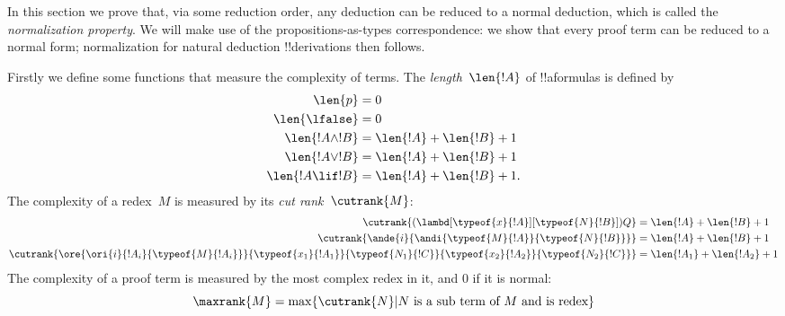 \documentclass[../../../include/open-logic-section]{subfiles}
\begin{document}


In this section we prove that, via some reduction order, any deduction
can be reduced to a normal deduction, which is called the
\emph{normalization property}. We will make use of the
propositions-as-types correspondence: we show that every proof term
can be reduced to a normal form; normalization for natural deduction
!!{derivation}s then follows.

Firstly we define some functions that measure the complexity of terms.
The \emph{length}~$\len{!A}$ of !!a{formula}s is defined by
\begin{align*}
  \len{p} &= 0\\
  \len{\lfalse} &= 0\\
  \len{!A \land !B} &= \len{!A} + \len{!B} + 1\\
  \len{!A \lor !B} &= \len{!A} + \len{!B} + 1 \\
  \len{!A \lif !B} &= \len{!A} + \len{!B} + 1.
\end{align*}
The complexity of a redex~$M$ is measured by its \emph{cut
  rank}~$\cutrank{M}$:
\begin{align*}
  \cutrank{(\lambd[\typeof{x}{!A}][\typeof{N}{!B}])Q} &=
  \len{!A} + \len{!B} + 1 \\
  \cutrank{\ande{i}{\andi{\typeof{M}{!A}}{\typeof{N}{!B}}}} &=
  \len{!A} + \len{!B} + 1 \\
  \cutrank{\ore{\ori{i}{!A_{i}}{\typeof{M}{!A_i}}}
    {\typeof{x_1}{!A_1}}{\typeof{N_1}{!C}}
    {\typeof{x_2}{!A_2}}{\typeof{N_2}{!C}}} &=
  \len{!A_1} + \len{!A_2} + 1
\end{align*}
The complexity of a proof term is measured by the most complex
redex in it, and $0$ if it is normal:
\[
  \maxrank{M} = \max \{\cutrank{N} | N \text{ is a sub term of } M \text{
    and is redex}\}
\]
\end{document}
